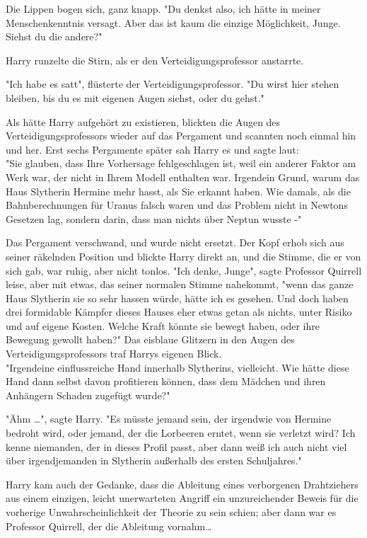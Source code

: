 {Die Lippen bogen sich, ganz knapp. "Du denkst also, ich hätte in meiner Menschenkenntnis versagt. Aber das ist kaum die einzige Möglichkeit, Junge. Siehst du die andere?"

Harry runzelte die Stirn, als er den Verteidigungsprofessor anstarrte.

"Ich habe es satt", flüsterte der Verteidigungsprofessor. "Du wirst hier stehen bleiben, bis du es mit eigenen Augen siehst, oder du gehst."

Als hätte Harry aufgehört zu existieren, blickten die Augen des Verteidigungsprofessors wieder auf das Pergament und scannten noch einmal hin und her. Erst sechs Pergamente später sah Harry es und sagte laut:\\ "Sie glauben, dass Ihre Vorhersage fehlgeschlagen ist, weil ein anderer Faktor am Werk war, der nicht in Ihrem Modell enthalten war. Irgendein Grund, warum das Haus Slytherin Hermine mehr hasst, als Sie erkannt haben. Wie damals, als die Bahnberechnungen für Uranus falsch waren und das Problem nicht in Newtons Gesetzen lag, sondern darin, dass man nichts über Neptun wusste -"

Das Pergament verschwand, und wurde nicht ersetzt. Der Kopf erhob sich aus seiner räkelnden Position und blickte Harry direkt an, und die Stimme, die er von sich gab, war ruhig, aber nicht tonlos. "Ich denke, Junge", sagte Professor Quirrell leise, aber mit etwas, das seiner normalen Stimme nahekommt, "wenn das ganze Haus Slytherin sie so sehr hassen würde, hätte ich es gesehen. Und doch haben drei formidable Kämpfer dieses Hauses eher etwas getan als nichts, unter Risiko und auf eigene Kosten. Welche Kraft könnte sie bewegt haben, oder ihre Bewegung gewollt haben?" Das eisblaue Glitzern in den Augen des Verteidigungsprofessors traf Harrys eigenen Blick.\\ "Irgendeine einflussreiche Hand innerhalb Slytherins, vielleicht. Wie hätte diese Hand dann selbst davon profitieren können, dass dem Mädchen und ihren Anhängern Schaden zugefügt wurde?"

"Ähm …", sagte Harry. "Es müsste jemand sein, der irgendwie von Hermine bedroht wird, oder jemand, der die Lorbeeren erntet, wenn sie verletzt wird? Ich kenne niemanden, der in dieses Profil passt, aber dann weiß ich auch nicht viel über irgendjemanden in Slytherin außerhalb des ersten Schuljahres."

Harry kam auch der Gedanke, dass die Ableitung eines verborgenen Drahtziehers aus einem einzigen, leicht unerwarteten Angriff ein unzureichender Beweis für die vorherige Unwahrscheinlichkeit der Theorie zu sein schien; aber dann war es Professor Quirrell, der die Ableitung vornahm…

}
